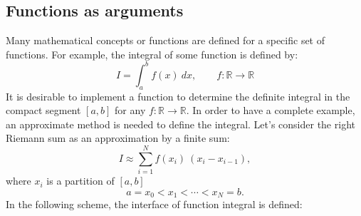 \subsection{Functions as arguments} 
Many mathematical concepts or functions are defined for a 
specific set of functions.
For example, the integral of some function is defined by: 
\begin{equation}
 I = \int _a ^b f(x)  \ dx, \qquad f: \mathbb{R} \rightarrow \mathbb{R}
\end{equation} 
It is desirable to implement a function to determine the definite integral
in the compact segment $ [a, b ]$ for any  
$  f: \mathbb{R} \rightarrow \mathbb{R} $. 
In order to have a complete example, an approximate method is needed to 
define the integral. Let's consider the right Riemann sum 
as an approximation by a finite sum: 
\begin{equation}
 I \approx \sum _{i=1} ^N f(x_i)  \ ( x_i - x_{i-1} ),
\end{equation}
where $ x_i $ is a partition of $ [a, b]$ 
\begin{equation}
 a = x_0 < x_1  < \cdots < x_N = b.
\end{equation}
In the following scheme, the interface of function integral is defined:  

\begin{center} 
\end{center} 



  
 \newpage 
